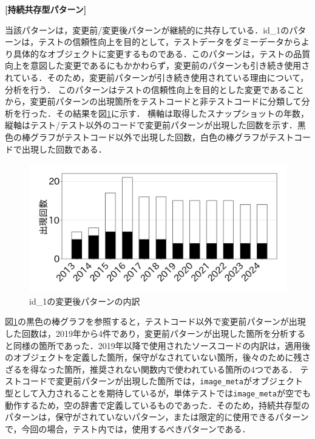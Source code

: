 \documentclass[11pt]{jreport}
\begin{document}
\noindent\textbf{[持続共存型パターン]} 

当該パターンは，変更前/変更後パターンが継続的に共存している．id\_1のパターンは，テストの信頼性向上を目的として，テストデータをダミーデータからより具体的なオブジェクトに変更するものである．このパターンは，テストの品質向上を意図した変更であるにもかかわらず，変更前のパターンも引き続き使用されている．そのため，変更前パターンが引き続き使用されている理由について，分析を行う．
このパターンはテストの信頼性向上を目的とした変更であることから，変更前パターンの出現箇所をテストコードと非テストコードに分類して分析を行った．その結果を図\ref{figure:test_or_not}に示す．
横軸は取得したスナップショットの年数，縦軸はテスト/テスト以外のコードで変更前パターンが出現した回数を示す．黒色の棒グラフがテストコード以外で出現した回数，白色の棒グラフがテストコードで出現した回数である．
\begin{figure}[h]
    \includegraphics[width=0.9\linewidth]{@BSthesis2024_Noguchi/Noguchi_fig/test_or_not_test.png}
    \vspace{-4mm}
    \caption{id\_1の変更後パターンの内訳}
    \label{figure:test_or_not}
\end{figure}

図\ref{figure:test_or_not}の黒色の棒グラフを参照すると，テストコード以外で変更前パターンが出現した回数は，2019年から4件であり，変更前パターンが出現した箇所を分析すると同様の箇所であった．2019年以降で使用されたソースコードの内訳は，適用後のオブジェクトを定義した箇所，保守がなされていない箇所，後々のために残さざるを得なった箇所，推奨されない関数内で使われている箇所の4つである．
テストコードで変更前パターンが出現した箇所では，\texttt{image\_meta}がオブジェクト型として入力されることを期待しているが，単体テストでは\texttt{image\_meta}が空でも動作するため，空の辞書で定義しているものであった．そのため，持続共存型のパターンは，保守がされていないパターン，または限定的に使用できるパターンで，今回の場合，テスト内では，使用するべきパターンである．
\end{document}
